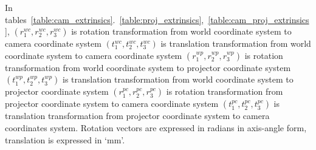  
In tables~\ref{table:cam_extrinsics}.~\ref{table:proj_extrinsics},~\ref{table:cam_proj_extrinsics},  
$(r_1^{wc},r_2^{wc},r_3^{wc})$ is rotation transformation from world coordinate system to camera coordinate system  
$(t_1^{wc},t_2^{wc},t_3^{wc})$ is translation transformation from world coordinate system to camera coordinate system  
$(r_1^{wp},r_2^{wp},r_3^{wp})$ is rotation transformation from world coordinate system to projector coordinate system  
$(t_1^{wp},t_2^{wp},t_3^{wp})$ is translation transformation from world coordinate system to projector coordinate system  
$(r_1^{pc},r_2^{pc},r_3^{pc})$ is rotation transformation from projector coordinate system to camera coordinate system  
$(t_1^{pc},t_2^{pc},t_3^{pc})$ is translation transformation from projector coordinate system to camera coordinates system. Rotation vectors are expressed in radians in axis-angle form, translation is expressed in `mm'.\newline  
